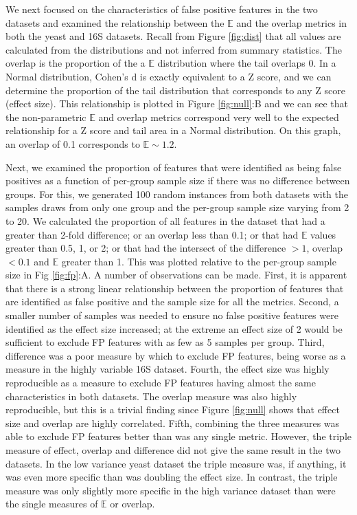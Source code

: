 \documentclass[fleqn,10pt,lineno]{wlpeerj}
\begin{document}
We next focused on the characteristics of false positive features in the two datasets and  examined the relationship between  the $\mathbb{E}$ and the overlap metrics in both the yeast and 16S datasets. Recall from Figure \ref{fig:dist} that all values are calculated from the distributions and not inferred from summary statistics. The overlap  is the proportion of the a $\mathbb{E}$ distribution where the tail overlaps 0. In a Normal distribution, Cohen's d is exactly equivalent to a Z score, and we can determine the proportion of the tail distribution that corresponds to any Z score (effect size). This relationship is plotted in Figure \ref{fig:null}:B and we can see that the non-parametric $\mathbb{E}$  and overlap metrics correspond very well to the expected relationship for a Z score and tail area in a Normal distribution. On this graph, an overlap of 0.1 corresponds to $ \mathbb{E} \sim 1.2$. 

Next, we  examined the proportion of features that were identified as being false positives as a function of per-group sample size if there was no difference between groups. For this, we generated 100 random instances from both datasets with the samples draws from only one group and the per-group sample size varying from 2 to 20. We calculated the proportion of  all features in the dataset that  had a greater than 2-fold difference; or an overlap less than 0.1;  or that had $\mathbb{E}$ values greater than 0.5, 1, or 2; or that had the intersect of the difference $>1$, overlap $<0.1$ and $\mathbb{E}$ greater than 1. This was plotted relative to the per-group sample size in Fig \ref{fig:fp}:A. A number of observations can be made. First, it is apparent that there is a strong linear relationship between the proportion of features that are identified as false positive and the sample size for all the metrics. Second, a smaller number of samples was needed to ensure no false positive features were identified as the effect size increased; at the extreme an effect size of 2 would be sufficient to exclude FP features with as few as 5 samples per group. Third, difference was a poor measure by which to exclude FP features, being worse as a measure in the highly variable  16S dataset. Fourth, the effect size was highly reproducible as a measure to exclude FP features having almost the same characteristics in both datasets. The overlap measure was also highly reproducible, but this is a trivial finding since Figure \ref{fig:null} shows that effect size and overlap are highly correlated. Fifth, combining the three measures was able to exclude FP features better than was any single metric. However, the triple measure of effect, overlap and difference did not give the same result in the two datasets. In the low variance yeast dataset the triple measure was, if anything, it was even more specific than was doubling  the effect size. In contrast, the triple measure was only slightly more specific in the high variance dataset than were the single measures of $\mathbb{E}$ or overlap.
\end{document}
